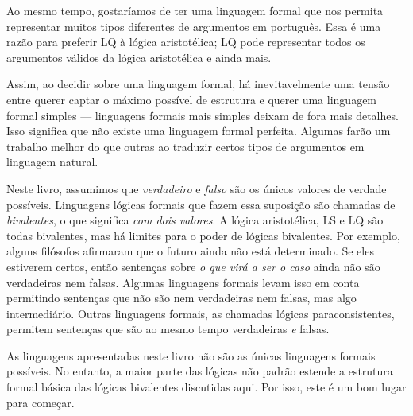 Ao mesmo tempo, gostaríamos de ter uma linguagem formal que nos permita representar muitos tipos diferentes de argumentos em português. Essa é uma razão para preferir LQ à lógica aristotélica; LQ pode representar todos os argumentos válidos da lógica aristotélica e ainda mais.

Assim, ao decidir sobre uma linguagem formal, há inevitavelmente uma tensão entre querer captar o máximo possível de estrutura e querer uma linguagem formal simples — linguagens formais mais simples deixam de fora mais detalhes. Isso significa que não existe uma linguagem formal perfeita. Algumas farão um trabalho melhor do que outras ao traduzir certos tipos de argumentos em linguagem natural.

Neste livro, assumimos que \emph{verdadeiro} e \emph{falso} são os únicos valores de verdade possíveis. Linguagens lógicas formais que fazem essa suposição são chamadas de \emph{bivalentes}, o que significa \emph{com dois valores}. A lógica aristotélica, LS e LQ são todas bivalentes, mas há limites para o poder de lógicas bivalentes. Por exemplo, alguns filósofos afirmaram que o futuro ainda não está determinado. Se eles estiverem certos, então sentenças sobre \emph{o que virá a ser o caso} ainda não são verdadeiras nem falsas.
Algumas linguagens formais levam isso em conta permitindo sentenças que não são nem verdadeiras nem falsas, mas algo intermediário.
Outras linguagens formais, as chamadas lógicas paraconsistentes, permitem sentenças que são ao mesmo tempo verdadeiras \emph{e} falsas.

As linguagens apresentadas neste livro não são as únicas linguagens formais possíveis. No entanto, a maior parte das lógicas não padrão estende a estrutura formal básica das lógicas bivalentes discutidas aqui. Por isso, este é um bom lugar para começar.

